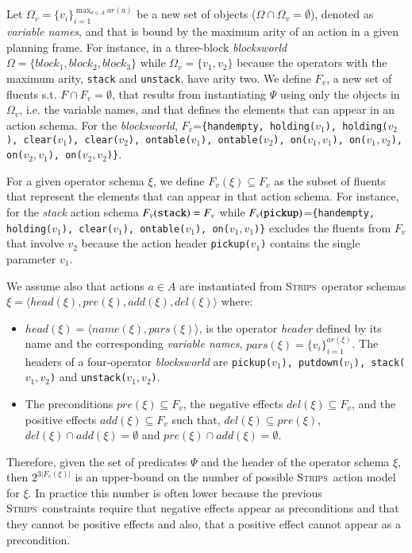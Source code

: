 \documentclass[3p,times]{elsarticle}
\newcommand{\strips}{\textsc{Strips}}     %
\newcommand{\tup}[1]{{\langle #1 \rangle}}
\begin{document}
Let $\Omega_v=\{v_i\}_{i=1}^{\operatorname*{max}_{a\in A} ar(a)}$ be a new set of objects ($\Omega\cap\Omega_v=\emptyset$), denoted as {\em variable names}, and that is bound by the maximum arity of an action in a given planning frame. For instance, in a three-block {\em blocksworld} $\Omega=\{block_1, block_2, block_3\}$ while $\Omega_v=\{v_1, v_2\}$ because the operators with the maximum arity, {\small\tt stack} and {\small\tt unstack}, have arity two. We define $F_v$, a new set of fluents s.t. $F\cap F_v=\emptyset$, that results from instantiating $\Psi$ using only the objects in $\Omega_v$, i.e. the variable names, and that defines the elements that can appear in an action schema. For the {\em blocksworld}, $F_v$={\small\tt\{handempty, holding($v_1$), holding($v_2$), clear($v_1$), clear($v_2$), ontable($v_1$), ontable($v_2$), on($v_1,v_1$), on($v_1,v_2$), on($v_2,v_1$), on($v_2,v_2$)\}}.

For a given operator schema $\xi$, we define $F_v(\xi)\subseteq F_v$ as the subset of fluents that represent the elements that can appear in that action schema. For instance, for the {\em stack} action schema $F_v({\tt stack})=F_v$ while $F_v({\tt pickup})$={\small\tt\{handempty, holding($v_1$), clear($v_1$), ontable($v_1$), on($v_1,v_1$)\}} excludes the fluents from $F_v$ that involve $v_2$ because the action header {\small\tt pickup($v_1$)} contains the single parameter $v_1$.

We assume also that actions $a\in A$ are instantiated from \strips\ operator schemas $\xi=\tup{head(\xi),pre(\xi),add(\xi),del(\xi)}$ where:
\begin{itemize}
\item $head(\xi)=\tup{name(\xi),pars(\xi)}$, is the operator {\em header} defined by its name and the corresponding {\em variable names}, $pars(\xi)=\{v_i\}_{i=1}^{ar(\xi)}$. The headers of a four-operator {\em blocksworld} are {\small\tt pickup($v_1$), putdown($v_1$), stack($v_1,v_2$)} and {\small\tt unstack($v_1,v_2$)}.
\item The preconditions $pre(\xi)\subseteq F_v$, the negative effects $del(\xi)\subseteq F_v$, and the positive effects $add(\xi)\subseteq F_v$ such that, $del(\xi)\subseteq pre(\xi)$, $del(\xi)\cap add(\xi)=\emptyset$ and $pre(\xi)\cap add(\xi)=\emptyset$.
\end{itemize}
Therefore, given the set of predicates $\Psi$ and the header of the operator schema $\xi$, then $2^{3|F_v(\xi)|}$ is an upper-bound on the number of possible \strips\ action model for $\xi$. In practice this number is often lower because the previous \strips\ constraints require that negative effects appear as preconditions and that they cannot be positive effects and also, that a positive effect cannot appear as a precondition.
\end{document}
